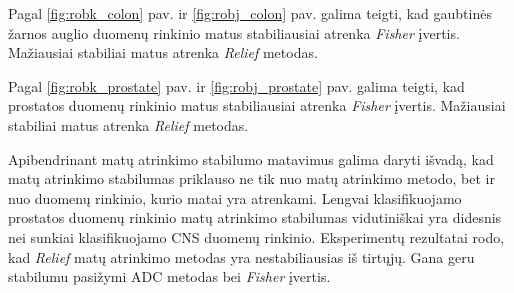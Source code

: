 Pagal \ref{fig:robk_colon} pav. ir \ref{fig:robj_colon} pav. galima teigti, kad gaubtinės žarnos auglio duomenų rinkinio matus stabiliausiai atrenka \textit{Fisher} įvertis. Mažiausiai stabiliai matus atrenka \textit{Relief} metodas.

Pagal \ref{fig:robk_prostate} pav. ir \ref{fig:robj_prostate} pav. galima teigti, kad prostatos duomenų rinkinio matus stabiliausiai atrenka \textit{Fisher} įvertis. Mažiausiai stabiliai matus atrenka \textit{Relief} metodas.

Apibendrinant matų atrinkimo stabilumo matavimus galima daryti išvadą, kad matų atrinkimo stabilumas priklauso ne tik nuo matų atrinkimo metodo, bet ir nuo duomenų rinkinio, kurio matai yra atrenkami. Lengvai klasifikuojamo prostatos duomenų rinkinio matų atrinkimo stabilumas vidutiniškai yra didesnis nei sunkiai klasifikuojamo CNS duomenų rinkinio. Eksperimentų rezultatai rodo, kad \textit{Relief} matų atrinkimo metodas yra nestabiliausias iš tirtųjų. Gana geru stabilumu pasižymi ADC metodas bei \textit{Fisher} įvertis.
